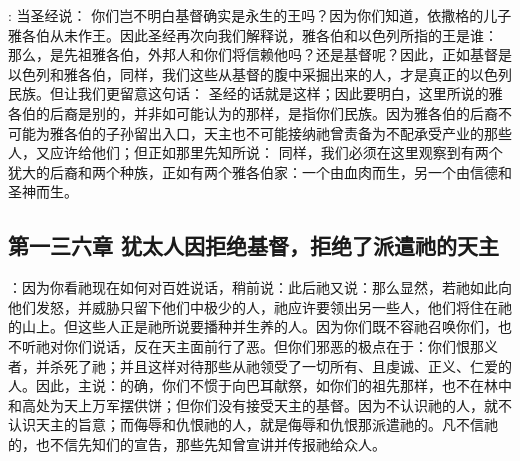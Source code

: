 : 当圣经说：  你们岂不明白基督确实是永生的王吗？因为你们知道，依撒格的儿子雅各伯从未作王。因此圣经再次向我们解释说，雅各伯和以色列所指的王是谁：  那么，是先祖雅各伯，外邦人和你们将信赖他吗？还是基督呢？因此，正如基督是以色列和雅各伯，同样，我们这些从基督的腹中采掘出来的人，才是真正的以色列民族。但让我们更留意这句话：  圣经的话就是这样；因此要明白，这里所说的雅各伯的后裔是别的，并非如可能认为的那样，是指你们民族。因为雅各伯的后裔不可能为雅各伯的子孙留出入口，天主也不可能接纳祂曾责备为不配承受产业的那些人，又应许给他们；但正如那里先知所说： 同样，我们必须在这里观察到有两个犹大的后裔和两个种族，正如有两个雅各伯家：一个由血肉而生，另一个由信德和圣神而生。\par


\subsection{第一三六章  犹太人因拒绝基督，拒绝了派遣祂的天主}

：因为你看祂现在如何对百姓说话，稍前说：此后祂又说：那么显然，若祂如此向他们发怒，并威胁只留下他们中极少的人，祂应许要领出另一些人，他们将住在祂的山上。但这些人正是祂所说要播种并生养的人。因为你们既不容祂召唤你们，也不听祂对你们说话，反在天主面前行了恶。但你们邪恶的极点在于：你们恨那义者，并杀死了祂；并且这样对待那些从祂领受了一切所有、且虔诚、正义、仁爱的人。因此，主说：的确，你们不惯于向巴耳献祭，如你们的祖先那样，也不在林中和高处为天上万军摆供饼；但你们没有接受天主的基督。因为不认识祂的人，就不认识天主的旨意；而侮辱和仇恨祂的人，就是侮辱和仇恨那派遣祂的。凡不信祂的，也不信先知们的宣告，那些先知曾宣讲并传报祂给众人。\par

